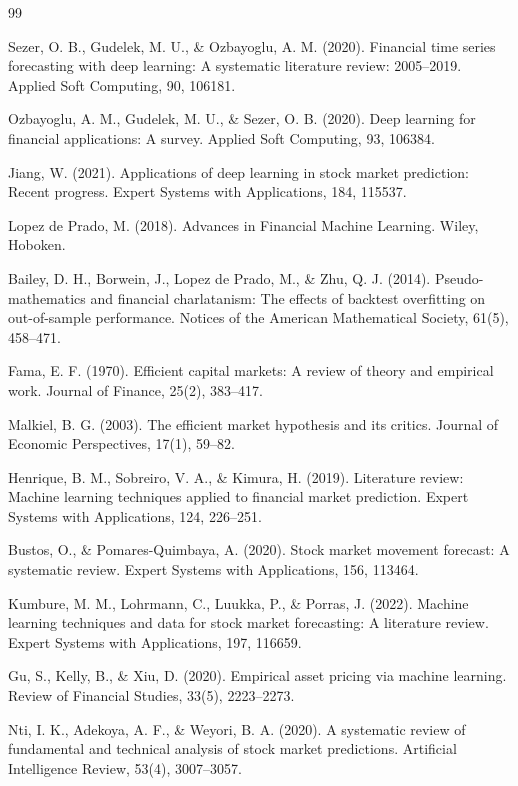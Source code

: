 \documentclass[10pt,a4paper,twocolumn]{article}
\begin{document}
\begin{thebibliography}{99}
\small
\setlength{\itemsep}{0pt}

 Sezer, O. B., Gudelek, M. U., \& Ozbayoglu, A. M. (2020). Financial time series forecasting with deep learning: A systematic literature review: 2005--2019. Applied Soft Computing, 90, 106181.

 Ozbayoglu, A. M., Gudelek, M. U., \& Sezer, O. B. (2020). Deep learning for financial applications: A survey. Applied Soft Computing, 93, 106384.

 Jiang, W. (2021). Applications of deep learning in stock market prediction: Recent progress. Expert Systems with Applications, 184, 115537.

 Lopez de Prado, M. (2018). Advances in Financial Machine Learning. Wiley, Hoboken.

 Bailey, D. H., Borwein, J., Lopez de Prado, M., \& Zhu, Q. J. (2014). Pseudo-mathematics and financial charlatanism: The effects of backtest overfitting on out-of-sample performance. Notices of the American Mathematical Society, 61(5), 458--471.

 Fama, E. F. (1970). Efficient capital markets: A review of theory and empirical work. Journal of Finance, 25(2), 383--417.

 Malkiel, B. G. (2003). The efficient market hypothesis and its critics. Journal of Economic Perspectives, 17(1), 59--82.

 Henrique, B. M., Sobreiro, V. A., \& Kimura, H. (2019). Literature review: Machine learning techniques applied to financial market prediction. Expert Systems with Applications, 124, 226--251.

 Bustos, O., \& Pomares-Quimbaya, A. (2020). Stock market movement forecast: A systematic review. Expert Systems with Applications, 156, 113464.

 Kumbure, M. M., Lohrmann, C., Luukka, P., \& Porras, J. (2022). Machine learning techniques and data for stock market forecasting: A literature review. Expert Systems with Applications, 197, 116659.

 Gu, S., Kelly, B., \& Xiu, D. (2020). Empirical asset pricing via machine learning. Review of Financial Studies, 33(5), 2223--2273.

 Nti, I. K., Adekoya, A. F., \& Weyori, B. A. (2020). A systematic review of fundamental and technical analysis of stock market predictions. Artificial Intelligence Review, 53(4), 3007--3057.


\end{thebibliography}
\end{document}
